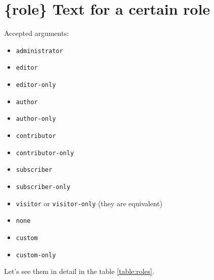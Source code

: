 \section{\{role\} Text for a certain role}

Accepted arguments:

\begin{itemize}
 \item \verb+administrator+
 \item \verb+editor+
 \item \verb+editor-only+
 \item \verb+author+
 \item \verb+author-only+
 \item \verb+contributor+
 \item \verb+contributor-only+
 \item \verb+subscriber+
 \item \verb+subscriber-only+
 \item \verb+visitor+ or \verb+visitor-only+ (they are equivalent)
 \item \verb+none+
 \item \verb+custom+
 \item \verb+custom-only+
\end{itemize}

Let's see them in detail in the table \vref{table:roles}.

